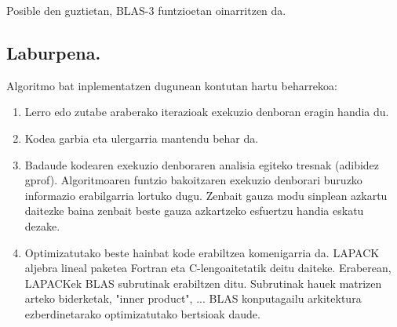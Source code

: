 Posible den guztietan, BLAS-3 funtzioetan oinarritzen da.


\subsection{Laburpena.}

Algoritmo bat inplementatzen dugunean kontutan hartu beharrekoa:

\begin{enumerate}

\item Lerro edo zutabe araberako iterazioak exekuzio denboran eragin handia du.

\item Kodea garbia eta ulergarria mantendu behar da.

\item Badaude kodearen exekuzio denboraren analisia egiteko tresnak (adibidez gprof). Algoritmoaren funtzio bakoitzaren exekuzio denborari buruzko informazio erabilgarria lortuko dugu. Zenbait gauza modu sinplean azkartu daitezke baina zenbait beste gauza azkartzeko esfuertzu handia eskatu dezake.

\item Optimizatutako beste hainbat kode erabiltzea komenigarria da. LAPACK aljebra lineal paketea Fortran eta C-lengoaitetatik deitu daiteke. Eraberean, LAPACKek BLAS subrutinak erabiltzen ditu.  Subrutinak hauek matrizen arteko biderketak, "inner product", ... BLAS konputagailu arkitektura ezberdinetarako optimizatutako bertsioak daude.
 


\end{enumerate}

